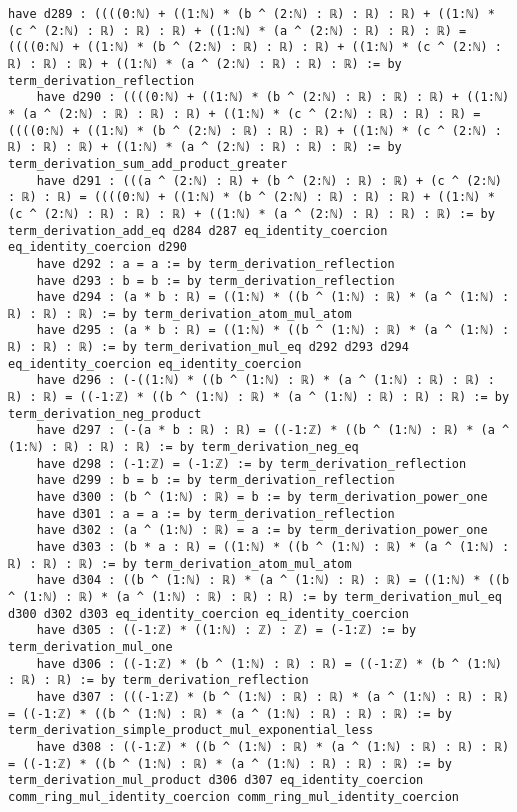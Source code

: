 \documentclass{article}
\begin{document}
\begin{tcolorbox}[colback=white!10, width=\linewidth]
\begin{lstlisting}[language=Lean4]
    have d289 : ((((0:ℕ) + ((1:ℕ) * (b ^ (2:ℕ) : ℝ) : ℝ) : ℝ) + ((1:ℕ) * (c ^ (2:ℕ) : ℝ) : ℝ) : ℝ) + ((1:ℕ) * (a ^ (2:ℕ) : ℝ) : ℝ) : ℝ) = ((((0:ℕ) + ((1:ℕ) * (b ^ (2:ℕ) : ℝ) : ℝ) : ℝ) + ((1:ℕ) * (c ^ (2:ℕ) : ℝ) : ℝ) : ℝ) + ((1:ℕ) * (a ^ (2:ℕ) : ℝ) : ℝ) : ℝ) := by term_derivation_reflection
    have d290 : ((((0:ℕ) + ((1:ℕ) * (b ^ (2:ℕ) : ℝ) : ℝ) : ℝ) + ((1:ℕ) * (a ^ (2:ℕ) : ℝ) : ℝ) : ℝ) + ((1:ℕ) * (c ^ (2:ℕ) : ℝ) : ℝ) : ℝ) = ((((0:ℕ) + ((1:ℕ) * (b ^ (2:ℕ) : ℝ) : ℝ) : ℝ) + ((1:ℕ) * (c ^ (2:ℕ) : ℝ) : ℝ) : ℝ) + ((1:ℕ) * (a ^ (2:ℕ) : ℝ) : ℝ) : ℝ) := by term_derivation_sum_add_product_greater
    have d291 : (((a ^ (2:ℕ) : ℝ) + (b ^ (2:ℕ) : ℝ) : ℝ) + (c ^ (2:ℕ) : ℝ) : ℝ) = ((((0:ℕ) + ((1:ℕ) * (b ^ (2:ℕ) : ℝ) : ℝ) : ℝ) + ((1:ℕ) * (c ^ (2:ℕ) : ℝ) : ℝ) : ℝ) + ((1:ℕ) * (a ^ (2:ℕ) : ℝ) : ℝ) : ℝ) := by term_derivation_add_eq d284 d287 eq_identity_coercion eq_identity_coercion d290
    have d292 : a = a := by term_derivation_reflection
    have d293 : b = b := by term_derivation_reflection
    have d294 : (a * b : ℝ) = ((1:ℕ) * ((b ^ (1:ℕ) : ℝ) * (a ^ (1:ℕ) : ℝ) : ℝ) : ℝ) := by term_derivation_atom_mul_atom
    have d295 : (a * b : ℝ) = ((1:ℕ) * ((b ^ (1:ℕ) : ℝ) * (a ^ (1:ℕ) : ℝ) : ℝ) : ℝ) := by term_derivation_mul_eq d292 d293 d294 eq_identity_coercion eq_identity_coercion
    have d296 : (-((1:ℕ) * ((b ^ (1:ℕ) : ℝ) * (a ^ (1:ℕ) : ℝ) : ℝ) : ℝ) : ℝ) = ((-1:ℤ) * ((b ^ (1:ℕ) : ℝ) * (a ^ (1:ℕ) : ℝ) : ℝ) : ℝ) := by term_derivation_neg_product
    have d297 : (-(a * b : ℝ) : ℝ) = ((-1:ℤ) * ((b ^ (1:ℕ) : ℝ) * (a ^ (1:ℕ) : ℝ) : ℝ) : ℝ) := by term_derivation_neg_eq
    have d298 : (-1:ℤ) = (-1:ℤ) := by term_derivation_reflection
    have d299 : b = b := by term_derivation_reflection
    have d300 : (b ^ (1:ℕ) : ℝ) = b := by term_derivation_power_one
    have d301 : a = a := by term_derivation_reflection
    have d302 : (a ^ (1:ℕ) : ℝ) = a := by term_derivation_power_one
    have d303 : (b * a : ℝ) = ((1:ℕ) * ((b ^ (1:ℕ) : ℝ) * (a ^ (1:ℕ) : ℝ) : ℝ) : ℝ) := by term_derivation_atom_mul_atom
    have d304 : ((b ^ (1:ℕ) : ℝ) * (a ^ (1:ℕ) : ℝ) : ℝ) = ((1:ℕ) * ((b ^ (1:ℕ) : ℝ) * (a ^ (1:ℕ) : ℝ) : ℝ) : ℝ) := by term_derivation_mul_eq d300 d302 d303 eq_identity_coercion eq_identity_coercion
    have d305 : ((-1:ℤ) * ((1:ℕ) : ℤ) : ℤ) = (-1:ℤ) := by term_derivation_mul_one
    have d306 : ((-1:ℤ) * (b ^ (1:ℕ) : ℝ) : ℝ) = ((-1:ℤ) * (b ^ (1:ℕ) : ℝ) : ℝ) := by term_derivation_reflection
    have d307 : (((-1:ℤ) * (b ^ (1:ℕ) : ℝ) : ℝ) * (a ^ (1:ℕ) : ℝ) : ℝ) = ((-1:ℤ) * ((b ^ (1:ℕ) : ℝ) * (a ^ (1:ℕ) : ℝ) : ℝ) : ℝ) := by term_derivation_simple_product_mul_exponential_less
    have d308 : ((-1:ℤ) * ((b ^ (1:ℕ) : ℝ) * (a ^ (1:ℕ) : ℝ) : ℝ) : ℝ) = ((-1:ℤ) * ((b ^ (1:ℕ) : ℝ) * (a ^ (1:ℕ) : ℝ) : ℝ) : ℝ) := by term_derivation_mul_product d306 d307 eq_identity_coercion comm_ring_mul_identity_coercion comm_ring_mul_identity_coercion

\end{lstlisting}
\end{tcolorbox}
\end{document}
